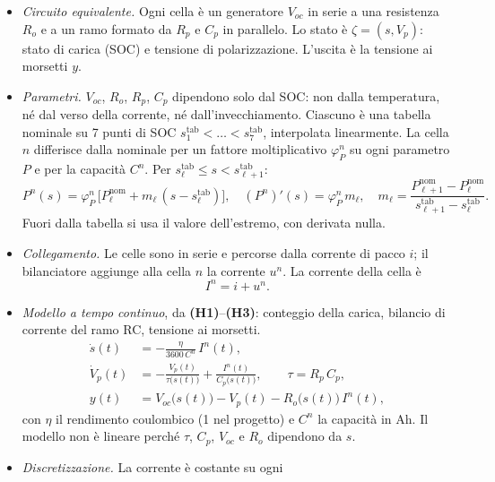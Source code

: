 \documentclass[11pt,a4paper]{article}
\newcommand{\nom}{\mathrm{nom}}
\newcommand{\stab}{s^{\mathrm{tab}}}        %
\newcommand{\ip}[1]{\textbf{(H#1)}}         %
\begin{document}
\begin{itemize}
  \item[\ip{1}] \emph{Circuito equivalente.} Ogni cella è un generatore
        $V_{oc}$ in serie a una resistenza $R_o$ e a un ramo formato da $R_p$
        e $C_p$ in parallelo. Lo stato è $\zeta = (s, V_p)$: stato di carica
        (SOC) e tensione di polarizzazione. L'uscita è la tensione ai morsetti
        $y$.
  \item[\ip{2}] \emph{Parametri.} $V_{oc}$, $R_o$, $R_p$, $C_p$ dipendono solo
        dal SOC: non dalla temperatura, né dal verso della corrente, né
        dall'invecchiamento. Ciascuno è una tabella nominale su 7 punti di SOC
        $\stab_1 < \dots < \stab_7$, interpolata linearmente. La cella $n$
        differisce dalla nominale per un fattore moltiplicativo $\varphi^n_P$ su
        ogni parametro $P$ e per la capacità $C^n$. Per
        $\stab_\ell \le s < \stab_{\ell+1}$:
        \[
          P^n(s) = \varphi^n_P\,\bigl[P^{\nom}_\ell + m_\ell\,(s - \stab_\ell)\bigr], \quad
          (P^n)'(s) = \varphi^n_P\, m_\ell, \quad
          m_\ell = \frac{P^{\nom}_{\ell+1} - P^{\nom}_\ell}{\stab_{\ell+1} - \stab_\ell} .
          \tag*{[L,~(T)]}
        \]
        Fuori dalla tabella si usa il valore dell'estremo, con derivata nulla.
  \item[\ip{3}] \emph{Collegamento.} Le celle sono in serie e percorse dalla
        corrente di pacco $i$; il bilanciatore aggiunge alla cella $n$ la
        corrente $u^n$. La corrente della cella è
        \[
          I^n = i + u^n .
          \tag*{eq.~3}
        \]
  \item \emph{Modello a tempo continuo}, da \ip{1}--\ip{3}: conteggio della
        carica, bilancio di corrente del ramo RC, tensione ai morsetti.
        \[
        \begin{aligned}
          \dot s(t) &= -\frac{\eta}{3600\,C^n}\, I^n(t) , \\
          \dot V_p(t) &= -\frac{V_p(t)}{\tau\bigl(s(t)\bigr)}
                          + \frac{I^n(t)}{C_p\bigl(s(t)\bigr)} ,
                          \qquad \tau = R_p\,C_p , \\
          y(t) &= V_{oc}\bigl(s(t)\bigr) - V_p(t) - R_o\bigl(s(t)\bigr)\, I^n(t) ,
        \end{aligned}
        \tag*{[L,~(C1)--(C3)]; eq.~1}
        \]
        con $\eta$ il rendimento coulombico (1 nel progetto) e $C^n$ la
        capacità in Ah. Il modello non è lineare perché $\tau$, $C_p$,
        $V_{oc}$ e $R_o$ dipendono da $s$.
  \item[\ip{4}] \emph{Discretizzazione.} La corrente è costante su ogni

\end{itemize}
\end{document}

